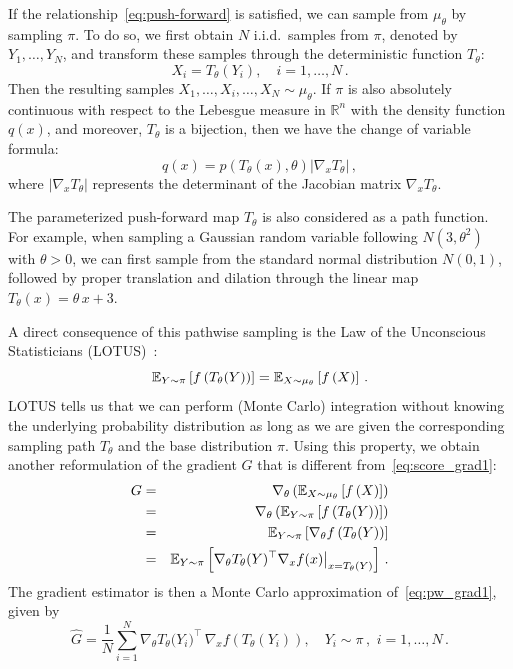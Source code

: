 \documentclass[12pt]{amsart}
\newcommand{\bbR}{\mathbb R} \newcommand{\bbS}{\mathbb S}
\begin{document}
If the relationship~\eqref{eq:push-forward} is satisfied, we can sample from $\mu_\theta$ by sampling $\pi$. To do so, we first obtain $N$ i.i.d.~samples from $\pi$, denoted by $Y_1,\dots, Y_N$, and transform these samples through the deterministic function $T_\theta$:
\begin{equation}\label{eq:path_sample}
    X_i = T_\theta(Y_i),\quad i = 1,\ldots, N\,.
\end{equation}
Then the resulting samples $X_1,\ldots, X_i,\ldots, X_N \sim \mu_\theta$. If $\pi$ is also absolutely continuous with respect to the Lebesgue measure in $\bbR^n$ with the density function $q(x)$, and moreover, $T_\theta$ is a bijection, then we have the change of variable formula:
\[
q(x) = p\left( T_\theta (x) ,\theta \right) |\nabla_x T_\theta|\,,
\]
where $|\nabla_x T_\theta|$ represents the determinant of the Jacobian matrix $\nabla_x T_\theta$. 

The parameterized push-forward map $T_\theta$ is also considered as a path function. For example, when sampling a Gaussian random variable following $N(3,\theta^2)$ with $\theta > 0$, we can first sample from the standard normal distribution $N(0,1)$, followed by proper translation and dilation through the linear map $T_\theta (x) = \theta \, x + 3 $.



A direct consequence of this pathwise sampling is the Law of the Unconscious Statisticians (LOTUS)~\cite{federer2014geometric}:
\begin{equation}\label{eq:LOTUS}
    \mathbb E_{Y\sim \pi} \left[ f\left(T_\theta(Y) \right) \right] = \mathbb E_{X\sim \mu_\theta} \left[ f\left(X \right) \right]\,.
\end{equation}
LOTUS tells us that we can perform (Monte Carlo) integration without
knowing the underlying probability distribution as long as we are given the corresponding sampling path $T_\theta$ and the base distribution $\pi$. Using this property, we obtain another reformulation of the  gradient $G$ that is different from~\eqref{eq:score_grad1}:
\begin{eqnarray}
    G &=& \nabla_\theta \left(\mathbb E_{X\sim \mu_\theta} \left[ f\left(X \right) \right]\right)  \nonumber \\
    &=& \nabla_\theta \left( \mathbb E_{Y\sim \pi} \left[ f\left(T_\theta(Y) \right) \right] \right) \nonumber \\
    &=&  \mathbb E_{Y\sim \pi} \left[ \nabla_\theta f\left(T_\theta(Y) \right) \right]\nonumber \\
    &=& \mathbb E_{Y\sim \pi} \left[   \nabla_\theta T_\theta(Y) ^\top \nabla_x f(x)\big|_{x=T_\theta(Y)} \right]  \label{eq:pw_grad1} \,.
\end{eqnarray}
The gradient estimator is then a Monte Carlo approximation of~\eqref{eq:pw_grad1}, given by
\begin{equation}\label{eq:pw_grad2}
    \widehat{G}  = \frac{1}{N}\sum_{i=1}^N \nabla_\theta T_\theta\big(Y_i) ^\top  \, \nabla_x f\left(T_{\theta}(Y_i)\right),\quad Y_i \sim \pi\,,\,\, i = 1,\ldots, N\,. 
\end{equation}
\end{document}
